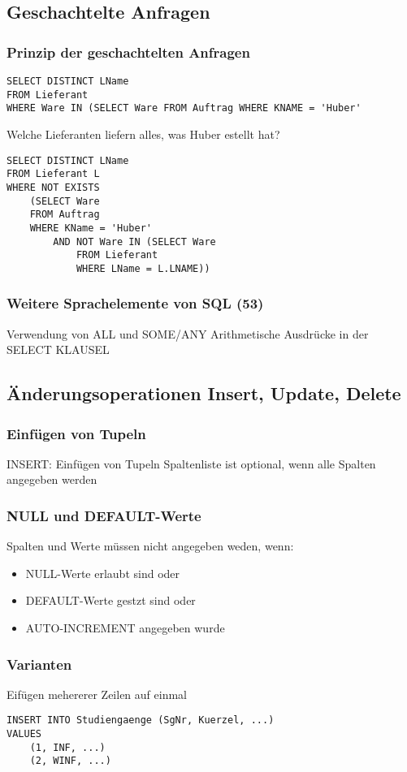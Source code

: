 \subsection{Geschachtelte Anfragen}
\subsubsection{Prinzip der geschachtelten Anfragen}
\begin{lstlisting}
SELECT DISTINCT LName
FROM Lieferant
WHERE Ware IN (SELECT Ware FROM Auftrag WHERE KNAME = 'Huber'
\end{lstlisting}
Welche Lieferanten liefern alles, was Huber estellt hat?
\begin{lstlisting}
SELECT DISTINCT LName
FROM Lieferant L
WHERE NOT EXISTS 
	(SELECT Ware
	FROM Auftrag
	WHERE KName = 'Huber'
		AND NOT Ware IN (SELECT Ware
			FROM Lieferant
			WHERE LName = L.LNAME))
\end{lstlisting}
\subsubsection{Weitere Sprachelemente von SQL (53)}
Verwendung von ALL und SOME/ANY
Arithmetische Ausdrücke in der SELECT KLAUSEL
\subsection{Änderungsoperationen Insert, Update, Delete}
\subsubsection{Einfügen von Tupeln}
INSERT: Einfügen von Tupeln
Spaltenliste ist optional, wenn alle Spalten angegeben werden
\subsubsection{NULL und DEFAULT-Werte}
Spalten und Werte müssen nicht angegeben weden, wenn:
\begin{itemize}
	\item NULL-Werte erlaubt sind oder
	\item DEFAULT-Werte gestzt sind oder 
	\item AUTO-INCREMENT angegeben wurde
\end{itemize}
\subsubsection{Varianten}
Eifügen mehererer Zeilen auf einmal
\begin{lstlisting}
INSERT INTO Studiengaenge (SgNr, Kuerzel, ...)
VALUES 
	(1, INF, ...)
	(2, WINF, ...)
\end{lstlisting}
